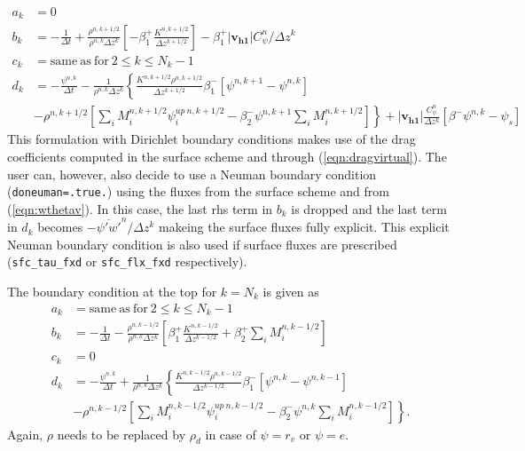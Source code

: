 \documentclass[dvipdfmx,a4paper,10pt]{article}
\begin{document}
\begin{align*}
  a_k &= 0 \\
    b_k &= -\frac{1}{\Delta t} +\frac{\rho^{n,k+1/2}}{\rho^{n,k}\Delta z^k} \left[- \beta_1^+\frac{K^{n,k+1/2}}{\Delta z^{k+1/2}} \right]-\beta_1^+|\mathbf{v_{h1}}|C^n_{\psi}/\Delta z^k  \\
      c_k &= \mathrm{same~as~for~}2\leq k \leq N_k-1 \\
      d_k &=  -\frac{\psi^{n,k}}{\Delta t} - \frac{1}{\rho^{n,k}\Delta z^k} \left\{ \frac{K^{n,k+1/2}\rho^{n,k+1/2}}{\Delta z^{k+1/2}}\beta_1^{-}\left[\psi^{n,k+1} - \psi^{n,k}\right]\right.   \\   
          & \left. -\rho^{n,k+1/2}\left[\sum_iM_i^{n,k+1/2}\psi_i^{up~n,k+1/2} -\beta_2^{-}\psi^{n,k+1}\sum_iM_i^{n,k+1/2} \right] \right\} +|\mathbf{v_{h1}}|\frac{C^n_{\psi}}{\Delta z^k}\left[\beta^-\psi^{n,k} - \psi_s\right]    
\end{align*}
This formulation with Dirichlet boundary conditions makes use of the drag coefficients computed in the surface scheme and through (\ref{eqn:dragvirtual}). The user can, however, also decide to use a Neuman boundary condition ({\tt doneuman=.true.}) using the fluxes from the surface scheme and from (\ref{eqn:wthetav}). In this case, the last rhs term in $b_k$ is dropped and the last term in $d_k$ becomes $- \overline{\psi'w'}^n/\Delta z^k$ makeing the surface fluxes fully explicit. This explicit Neuman boundary condition is also used if surface fluxes are prescribed ({\tt sfc\_tau\_fxd} or {\tt sfc\_flx\_fxd} respectively). 

The boundary condition at the top for $k=N_k$ is given as
\begin{align*}
  a_k &= \mathrm{same~as~for~}2\leq k \leq N_k-1  \\
    b_k &= -\frac{1}{\Delta t} - \frac{\rho^{n,k-1/2}}{\rho^{n,k}\Delta z^k} \left[\beta_1^+\frac{K^{n,k-1/2}}{\Delta z ^{k-1/2}}+\beta_2^+\sum_iM_i^{n,k-1/2} \right] \\
      c_k &= 0 \\
      d_k &= -\frac{\psi^{n,k}}{\Delta t} + \frac{1}{\rho^{n,k}\Delta z^k} \left\{ \frac{K^{n,k-1/2}\rho^{n,k-1/2}}{\Delta z^{k-1/2}}\beta_1^{-}\left[\psi^{n,k} - \psi^{n,k-1}\right]\right.   \\   
          & \left.-\rho^{n,k-1/2}\left[\sum_iM_i^{n,k-1/2}\psi_i^{up~n,k-1/2} -\beta_2^{-}\psi^{n,k}\sum_iM_i^{n,k-1/2} \right]\right\}.    
\end{align*}
Again, $\rho$ needs to be replaced by $\rho_d$ in case of $\psi=r_v$ or $\psi=e$. 
\end{document}
